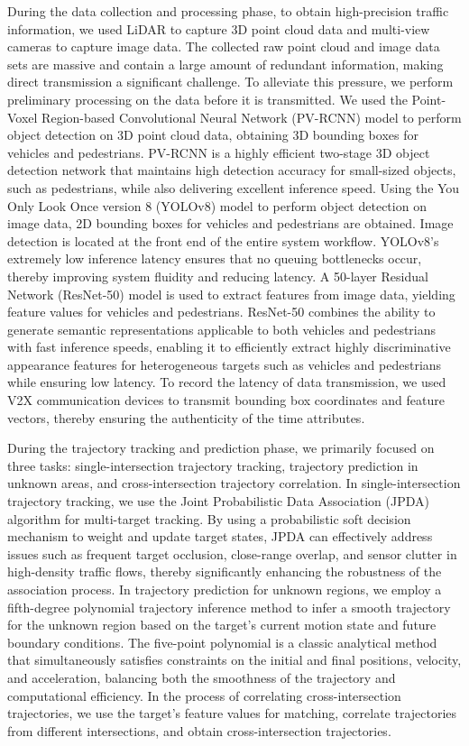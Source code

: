 \documentclass[lineno,pdflatex,sn-basic]{sn-jnl}%
\theoremstyle{thmstyleone}%
\theoremstyle{thmstyletwo}%
\theoremstyle{thmstylethree}%
\begin{document}
During the data collection and processing phase, to obtain high-precision traffic information, we used LiDAR to capture 3D point cloud data and multi-view cameras to capture image data.
The collected raw point cloud and image data sets are massive and contain a large amount of redundant information, making direct transmission a significant challenge.
To alleviate this pressure, we perform preliminary processing on the data before it is transmitted.
We used the Point-Voxel Region-based Convolutional Neural Network (PV-RCNN) model to perform object detection on 3D point cloud data, obtaining 3D bounding boxes for vehicles and pedestrians.
PV-RCNN is a highly efficient two-stage 3D object detection network that maintains high detection accuracy for small-sized objects, such as pedestrians, while also delivering excellent inference speed.
Using the You Only Look Once version 8 (YOLOv8) model to perform object detection on image data, 2D bounding boxes for vehicles and pedestrians are obtained.
Image detection is located at the front end of the entire system workflow. YOLOv8’s extremely low inference latency ensures that no queuing bottlenecks occur, thereby improving system fluidity and reducing latency.
A 50-layer Residual Network (ResNet-50) model is used to extract features from image data, yielding feature values for vehicles and pedestrians.
ResNet-50 combines the ability to generate semantic representations applicable to both vehicles and pedestrians with fast inference speeds, enabling it to efficiently extract highly discriminative appearance features for heterogeneous targets such as vehicles and pedestrians while ensuring low latency.
To record the latency of data transmission, we used V2X communication devices to transmit bounding box coordinates and feature vectors, thereby ensuring the authenticity of the time attributes.

During the trajectory tracking and prediction phase, we primarily focused on three tasks: single-intersection trajectory tracking, trajectory prediction in unknown areas, and cross-intersection trajectory correlation.
In single-intersection trajectory tracking, we use the Joint Probabilistic Data Association (JPDA) algorithm for multi-target tracking.
By using a probabilistic soft decision mechanism to weight and update target states, JPDA can effectively address issues such as frequent target occlusion, close-range overlap, and sensor clutter in high-density traffic flows, thereby significantly enhancing the robustness of the association process.
In trajectory prediction for unknown regions, we employ a fifth-degree polynomial trajectory inference method to infer a smooth trajectory for the unknown region based on the target’s current motion state and future boundary conditions.
The five-point polynomial is a classic analytical method that simultaneously satisfies constraints on the initial and final positions, velocity, and acceleration, balancing both the smoothness of the trajectory and computational efficiency.
In the process of correlating cross-intersection trajectories, we use the target’s feature values for matching, correlate trajectories from different intersections, and obtain cross-intersection trajectories.
\end{document}
